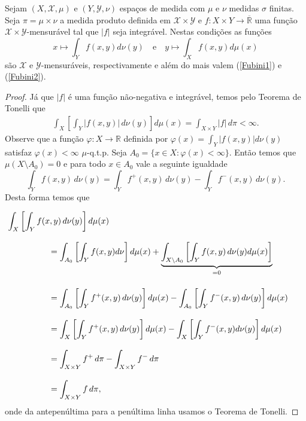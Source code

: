 \begin{teorema}[Fubini]
Sejam $(X, \mathscr{X}, \mu)$ e $(Y, \mathscr{Y}, \nu)$
espaços de medida com $\mu$ e $\nu$ medidas $\sigma$ finitas. 
Seja $\pi= \mu\times \nu$ a medida produto definida
em $\mathscr{X}\times \mathscr{Y}$  e 
$f:X\times Y\to \overline{\mathbb{R}}$ uma função 
$\mathscr{X}\times \mathscr{Y}$-mensurável tal que 
$|f|$ seja integrável. 
Nestas condições as funções 
\begin{equation}\label{sec-int-mensuraveis-teo-tonelli}
x\mapsto \int_Y f(x,y) d\nu(y)
\quad\text{e}\quad
y\mapsto \int_X f(x,y) d\mu(x)
\end{equation}
são $\mathscr{X}$ e $\mathscr{Y}$-mensuráveis, respectivamente
e além do mais valem (\ref{Fubini1}) e (\ref{Fubini2}).
\end{teorema}

\begin{proof}
Já que $|f|$ é uma função não-negativa 
e integrável, temos pelo Teorema de Tonelli que 
\begin{eqnarray}\label{Fubini 2}
\int_X \left[ \int_Y |f(x,y)| \,d\nu(y)  \right] d\mu(x)
=
\int_{X\times Y}|f|\,  d\pi<\infty.
\end{eqnarray}
Observe que a função $\varphi:X\to \mathbb{R}$ 
definida por $\varphi(x)=\int_Y |f(x,y)| d\nu(y)$ 
satisfaz  $\varphi(x)<\infty$ $\mu$-q.t.p.  
Seja $A_0= \{ x\in X: \varphi(x)<\infty \}$.
Então temos que 
$\mu(X\setminus A_0)=0
$ e para todo $x\in A_0$ vale a seguinte igualdade  
\begin{equation}
\int_Y f(x,y)\, d\nu(y)
=
\int_{Y}f^{+}(x,y)\, d\nu(y)
-
\int_Y f^{-}(x,y)\, d\nu(y).
\end{equation}
Desta forma temos que  

\begin{align*}
\hspace{3em}&\hspace{-5em}
\int_X  \left[ \int_Y f(x,y)\, d\nu(y) \right] d\mu(x)
\\[0.3cm]
&=
\int_{A_0}
\left[ \int_Y f(x,y)d\nu\right] d\mu(x)
+
\underbrace{
\int_{X\setminus A_0} 
\left[
\int_Y f(x,y)\, d\nu(y) d\mu(x)
\right]
}_{=0}
\\[0.4cm]
%
%
&=
\int_{A_0}\left[
\int_{Y}f^{+}(x,y)\, d\nu(y)
\right] d\mu(x)
-
\int_{A_0}\left[
\int_{Y}f^{-}(x,y)\, d\nu(y)
\right] d\mu(x)
\\[3mm]
%
%
&=
\int_{X}\left[
\int_{Y}f^{+}(x,y)\, d\nu(y) 
\right] d\mu(x)
-
\int_{X}\left[ 
\int_{Y}f^{-}(x,y)d\nu(y)
\right] d\mu(x)
\\[3mm]
%
%
&=
\int_{X\times Y}
f^{+}\, d\pi 
-
\int_{X\times Y}
f^{-}\, d\pi
\\[3mm]
%
%
&=
\int_{X\times Y}
f\, d\pi,
\end{align*}
onde da antepenúltima para a penúltima linha 
usamos o Teorema de Tonelli.
\end{proof}


